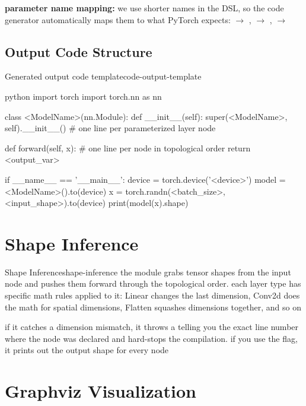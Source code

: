 \documentclass{nngraph-en}
\begin{document}
\begin{notebox}
\textbf{parameter name mapping:} we use shorter names in the DSL, so the code generator automatically maps them to what PyTorch expects:  $\to$ ,  $\to$ ,  $\to$ 
\end{notebox}

\subsection{Output Code Structure}

\begin{codebox}{Generated output code template}{code-output-template}
\begin{amzcode}{python}
import torch
import torch.nn as nn


class <ModelName>(nn.Module):
    def __init__(self):
        super(<ModelName>, self).__init__()
        # one line per parameterized layer node

    def forward(self, x):
        # one line per node in topological order
        return <output_var>


if __name__ == '__main__':
    device = torch.device('<device>')
    model  = <ModelName>().to(device)
    x      = torch.randn(<batch_size>, <input_shape>).to(device)
    print(model(x).shape)
\end{amzcode}
\end{codebox}

\section{Shape Inference}

\begin{dfnbox}{Shape Inference}{shape-inference}
the  module grabs tensor shapes from the input node and pushes them forward through the topological order. each layer type has specific math rules applied to it: Linear changes the last dimension, Conv2d does the math for spatial dimensions, Flatten squashes dimensions together, and so on
\end{dfnbox}

if it catches a dimension mismatch, it throws a  telling you the exact line number where the node was declared and hard-stops the compilation. if you use the  flag, it prints out the output shape for every node

\section{Graphviz Visualization}
\end{document}
